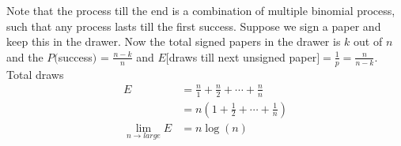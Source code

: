 \documentclass[../../probability-notes.tex]{subfile}
\begin{document}
Note that the process till the end is a combination of multiple binomial process, such that any process lasts till the first success. Suppose we sign a paper and keep this in the drawer. Now the total signed papers in the drawer is $k$ out of $n$ and the $P($success$)$ = $\frac{n-k}{n}$ and $E[$draws till next unsigned paper$] = \frac{1}{p} = \frac{n}{n-k}$. Total draws
        \begin{align*}
            E &= \frac{n}{1} + \frac{n}{2} + \cdots + \frac{n}{n}\\
             &= n(1 + \frac{1}{2} + \cdots + \frac{1}{n})\\
            \lim_{n \to large} E &= n \log(n) 
        \end{align*}
\end{document}
